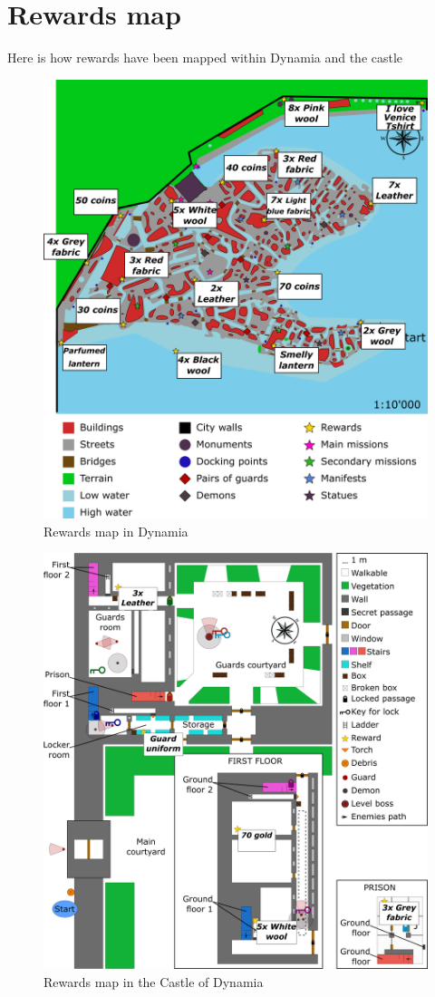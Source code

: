 \section{Rewards map}
Here is how rewards have been mapped within Dynamia and the castle
\begin{figure}[H]
  \centering
  \includegraphics[width=\textwidth]{Images/Maps/dynamiaRewardsMapping}
  \caption{Rewards map in Dynamia}
\end{figure}

\begin{figure}[H]
  \centering
  \includegraphics[width=\textwidth]{Images/Maps/castleOfDynamiaRewardsMapping}
  \caption{Rewards map in the Castle of Dynamia}
\end{figure}
